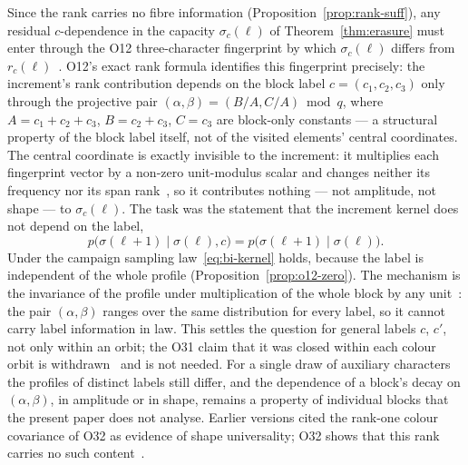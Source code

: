\documentclass[11pt,a4paper]{article}
\theoremstyle{plain}
\theoremstyle{definition}
\theoremstyle{remark}
\begin{document}
  \begin{description}[style=nextline]
\item[\textup{[O-1a$'$]} Fingerprint preservation of the rank kernel (settled in law for O12).]
Since the rank carries no fibre information (Proposition~\ref{prop:rank-suff}),
any residual $c$-dependence in the capacity $\sigma_c(\ell)$ of Theorem~\ref{thm:erasure}
must enter through the O12 three-character fingerprint by which $\sigma_c(\ell)$ differs from
$r_c(\ell)$~\cite{Beau2026a16}.
O12's exact rank formula identifies this fingerprint precisely: the increment's rank contribution
depends on the block label $c=(c_1,c_2,c_3)$ only through the projective pair
$(\alpha,\beta)=(B/A,C/A) \bmod q$, where $A=c_1+c_2+c_3$, $B=c_2+c_3$, $C=c_3$ are block-only
constants --- a structural property of the block label itself, not of the visited elements'
central coordinates.
The central coordinate is exactly invisible to the increment: it multiplies each fingerprint
vector by a non-zero unit-modulus scalar and changes neither its frequency nor its span
rank~\cite{Beau2026a16}, so it contributes nothing --- not amplitude, not shape --- to
$\sigma_c(\ell)$.
The task was the statement that the increment kernel does not depend on the label,
\begin{equation}
  \label{eq:bi-kernel}
  p\bigl(\sigma(\ell+1) \mid \sigma(\ell), c\bigr) = p\bigl(\sigma(\ell+1) \mid \sigma(\ell)\bigr).
\end{equation}
Under the campaign sampling law~\eqref{eq:bi-kernel} holds, because the label is independent
of the whole profile (Proposition~\ref{prop:o12-zero}).
The mechanism is the invariance of the profile under multiplication of the whole block by any
unit~\cite{Beau2026a16,Beau2026a36}: the pair $(\alpha,\beta)$ ranges over the same distribution for every
label, so it cannot carry label information in law.
This settles the question for general labels $c$, $c'$, not only within an orbit; the O31 claim
that it was closed within each colour orbit is withdrawn~\cite{Beau2026a35} and is not needed.
For a single draw of auxiliary characters the profiles of distinct labels still differ, and
the dependence of a block's decay on $(\alpha,\beta)$, in amplitude or in shape, remains a
property of individual blocks that the present paper does not analyse.
Earlier versions cited the rank-one colour covariance of O32 as evidence of shape
universality; O32 shows that this rank carries no such content~\cite{Beau2026a36}.


\end{description}
\end{document}

